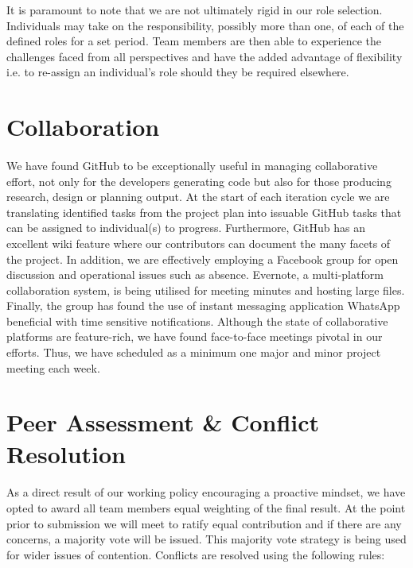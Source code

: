 \documentclass[11pt,a4paper]{article}
\begin{document}
It is paramount to note that we are not ultimately rigid in our role selection.  Individuals may take on the responsibility, possibly more than one, of each of the defined roles for a set period.  Team members are then able to experience the challenges faced from all perspectives and have the added advantage of flexibility i.e. to re-assign an individual's role should they be required elsewhere.

\section{Collaboration}
\paragraph{}
We have found GitHub to be exceptionally useful in managing collaborative effort, not only for the developers generating code but also for those producing research, design or planning output.  At the start of each iteration cycle we are translating identified tasks from the project plan into issuable GitHub tasks that can be assigned to individual(s) to progress.  Furthermore, GitHub has an excellent wiki feature where our contributors can document the many facets of the project.
\newline
 In addition, we are effectively employing a Facebook group for open discussion and operational issues such as absence.  Evernote, a multi-platform collaboration system, is being utilised for meeting minutes and hosting large files.  Finally, the group has found the use of instant messaging application WhatsApp beneficial with time sensitive notifications.
\newline
 Although the state of collaborative platforms are feature-rich, we have found face-to-face meetings pivotal in our efforts.  Thus, we have scheduled as a minimum one major and minor project meeting each week.

\section{Peer Assessment \& Conflict Resolution}
\paragraph{}
As a direct result of our working policy encouraging a proactive mindset, we have opted to award all team members equal weighting of the final result.  At the point prior to submission we will meet to ratify equal contribution and if there are any concerns, a majority vote will be issued.
This majority vote strategy is being used for wider issues of contention.  Conflicts are resolved using the following rules:
\end{document}
